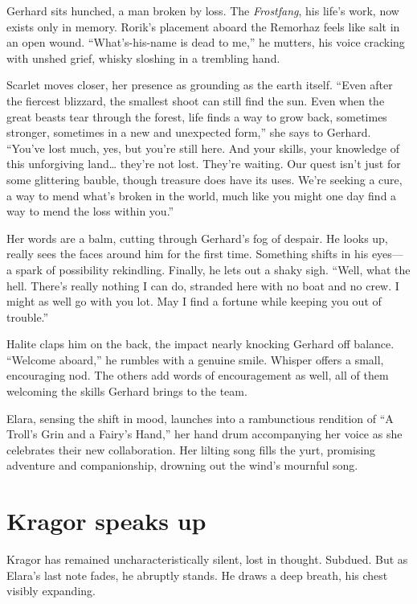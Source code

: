 \documentclass[
  letterpaper,12pt,twoside,twocolumn,openany,
  nodeprecatedcode,bg=full]{dndbook}
\begin{document}
Gerhard sits hunched, a man broken by loss. The \emph{Frostfang}, his
life's work, now exists only in memory. Rorik's placement aboard the
Remorhaz feels like salt in an open wound. ``What's-his-name is dead to
me,'' he mutters, his voice cracking with unshed grief, whisky sloshing
in a trembling hand.

Scarlet moves closer, her presence as grounding as the earth itself.
``Even after the fiercest blizzard, the smallest shoot can still find
the sun. Even when the great beasts tear through the forest, life finds
a way to grow back, sometimes stronger, sometimes in a new and
unexpected form,'' she says to Gerhard. ``You've lost much, yes, but
you're still here. And your skills, your knowledge of this unforgiving
land\ldots{} they're not lost. They're waiting. Our quest isn't just for
some glittering bauble, though treasure does have its uses. We're
seeking a cure, a way to mend what's broken in the world, much like you
might one day find a way to mend the loss within you.''

Her words are a balm, cutting through Gerhard's fog of despair. He looks
up, really sees the faces around him for the first time. Something
shifts in his eyes--- a spark of possibility rekindling. Finally, he
lets out a shaky sigh. ``Well, what the hell. There's really nothing I
can do, stranded here with no boat and no crew. I might as well go with
you lot. May I find a fortune while keeping you out of trouble.''

Halite claps him on the back, the impact nearly knocking Gerhard off
balance. ``Welcome aboard,'' he rumbles with a genuine smile. Whisper
offers a small, encouraging nod. The others add words of encouragement
as well, all of them welcoming the skills Gerhard brings to the team.

Elara, sensing the shift in mood, launches into a rambunctious rendition
of ``A Troll's Grin and a Fairy's Hand,'' her hand drum accompanying her
voice as she celebrates their new collaboration. Her lilting song fills
the yurt, promising adventure and companionship, drowning out the wind's
mournful song.

\section{Kragor speaks up}\label{kragor-speaks-up}

Kragor has remained uncharacteristically silent, lost in thought.
Subdued. But as Elara's last note fades, he abruptly stands. He draws a
deep breath, his chest visibly expanding.
\end{document}
